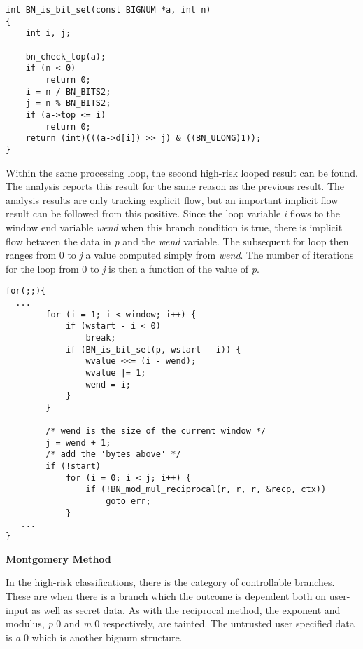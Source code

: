\documentclass[11pt,a4paper]{article}
\newcommand{\codevar}[1]{\textit{#1}}
\newcommand{\ruleabove}{}
\newcommand{\rulebelow}{}
\begin{document}
\ruleabove
\begin{lstlisting}[caption=OpenSSL 1.1.0g - bn\_lib.c lines 741 - 753]
int BN_is_bit_set(const BIGNUM *a, int n)
{
    int i, j;

    bn_check_top(a);
    if (n < 0)
        return 0;
    i = n / BN_BITS2;
    j = n % BN_BITS2;
    if (a->top <= i)
        return 0;
    return (int)(((a->d[i]) >> j) & ((BN_ULONG)1));
}
\end{lstlisting}
\rulebelow

Within the same processing loop, the second high-risk looped result can be
found. The analysis reports this result for the same reason as the previous
result. The analysis results are only tracking explicit flow, but an important
implicit flow result can be followed from this positive. Since the loop variable
\codevar{i} flows to the window end variable \codevar{wend} when this branch condition is true,
there is implicit flow between the data in \codevar{p} and the \codevar{wend} variable.  The
subsequent for loop then ranges from 0 to \codevar{j} a value computed simply from \codevar{wend}.
The number of iterations for the loop from 0 to \codevar{j} is then a function of the
value of \codevar{p}.

\ruleabove
\begin{lstlisting}[caption=OpenSSL 1.1.0g - bn\_exp.c lines 250-297]
for(;;){
  ...
        for (i = 1; i < window; i++) {
            if (wstart - i < 0)
                break;
            if (BN_is_bit_set(p, wstart - i)) {
                wvalue <<= (i - wend);
                wvalue |= 1;
                wend = i;
            }
        }

        /* wend is the size of the current window */
        j = wend + 1;
        /* add the 'bytes above' */
        if (!start)
            for (i = 0; i < j; i++) {
                if (!BN_mod_mul_reciprocal(r, r, r, &recp, ctx))
                    goto err;
            }
   ...
}
\end{lstlisting}
\rulebelow

\noindent
\textbf{Montgomery Method}

   In the high-risk classifications, there is the category of controllable
   branches. These are when there is a branch which the outcome is dependent
   both on user-input as well as secret data. As with the reciprocal method, the
   exponent and modulus, \codevar{p} 0 and \codevar{m} 0 respectively, are tainted. The
   untrusted user specified data is \codevar{a} 0 which is another bignum structure.
   
\end{document}
